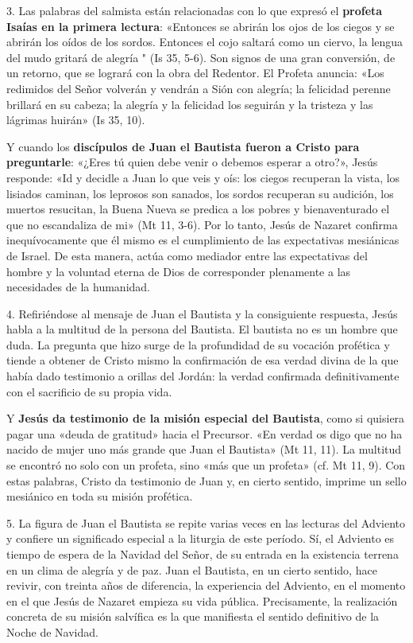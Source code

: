 \documentclass[]{article}
\begin{document}
3. Las palabras del salmista están relacionadas con lo que expresó el
\textbf{profeta Isaías en la primera lectura}: «Entonces se abrirán los
ojos de los ciegos y se abrirán los oídos de los sordos. Entonces el
cojo saltará como un ciervo, la lengua del mudo gritará de alegría " (Is
35, 5-6). Son signos de una gran conversión, de un retorno, que se
logrará con la obra del Redentor. El Profeta anuncia: «Los redimidos del
Señor volverán y vendrán a Sión con alegría; la felicidad perenne
brillará en su cabeza; la alegría y la felicidad los seguirán y la
tristeza y las lágrimas huirán» (Is 35, 10).

Y cuando los \textbf{discípulos de Juan el Bautista fueron a Cristo para
preguntarle}: «¿Eres tú quien debe venir o debemos esperar a otro?»,
Jesús responde: «Id y decidle a Juan lo que veis y oís: los ciegos
recuperan la vista, los lisiados caminan, los leprosos son sanados, los
sordos recuperan su audición, los muertos resucitan, la Buena Nueva se
predica a los pobres y bienaventurado el que no escandaliza de mi» (Mt
11, 3-6). Por lo tanto, Jesús de Nazaret confirma inequívocamente que él
mismo es el cumplimiento de las expectativas mesiánicas de Israel. De
esta manera, actúa como mediador entre las expectativas del hombre y la
voluntad eterna de Dios de corresponder plenamente a las necesidades de
la humanidad.

4. Refiriéndose al mensaje de Juan el Bautista y la consiguiente
respuesta, Jesús habla a la multitud de la persona del Bautista. El
bautista no es un hombre que duda. La pregunta que hizo surge de la
profundidad de su vocación profética y tiende a obtener de Cristo mismo
la confirmación de esa verdad divina de la que había dado testimonio a
orillas del Jordán: la verdad confirmada definitivamente con el
sacrificio de su propia vida.

Y \textbf{Jesús da testimonio de la misión especial del Bautista}, como
si quisiera pagar una «deuda de gratitud» hacia el Precursor. «En verdad
os digo que no ha nacido de mujer uno más grande que Juan el Bautista»
(Mt 11, 11). La multitud se encontró no solo con un profeta, sino «más
que un profeta» (cf. Mt 11, 9). Con estas palabras, Cristo da testimonio
de Juan y, en cierto sentido, imprime un sello mesiánico en toda su
misión profética.

5. La figura de Juan el Bautista se repite varias veces en las lecturas
del Adviento y confiere un significado especial a la liturgia de este
período. Sí, el Adviento es tiempo de espera de la Navidad del Señor, de
su entrada en la existencia terrena en un clima de alegría y de paz.
Juan el Bautista, en un cierto sentido, hace revivir, con treinta años
de diferencia, la experiencia del Adviento, en el momento en el que
Jesús de Nazaret empieza su vida pública. Precisamente, la realización
concreta de su misión salvífica es la que manifiesta el sentido
definitivo de la Noche de Navidad.
\end{document}
